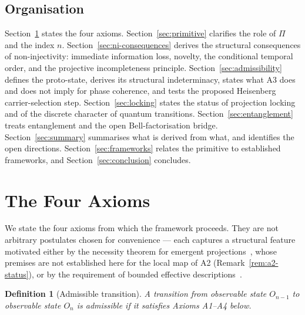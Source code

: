 \documentclass[11pt,a4paper]{article}
\newtheorem{definition}[theorem]{Definition}
\begin{document}
  \subsection*{Organisation}

    Section~\ref{sec:axioms} states the four axioms.
    Section~\ref{sec:primitive} clarifies the role of $\Pi$ and the index $n$.
    Section~\ref{sec:ni-consequences} derives the structural consequences of
    non-injectivity: immediate information loss, novelty, the conditional temporal order, and the
    projective incompleteness principle.
    Section~\ref{sec:admissibility} defines the proto-state, derives its structural indeterminacy, states
    what A3 does and does not imply for phase
    coherence, and tests the proposed Heisenberg carrier-selection step.
    Section~\ref{sec:locking} states the status of projection locking and of the discrete character
    of quantum transitions.
    Section~\ref{sec:entanglement} treats entanglement and the open Bell-factorisation bridge.
    Section~\ref{sec:summary} summarises what is derived from what, and identifies
    the open directions.
    Section~\ref{sec:frameworks} relates the primitive to established frameworks, and
    Section~\ref{sec:conclusion} concludes.

    \clearpage

  \section{The Four Axioms}
  \label{sec:axioms}

  We state the four axioms from which the framework proceeds.
  They are not arbitrary postulates chosen for convenience — each captures
  a structural feature motivated either by the necessity theorem for emergent
  projections~\cite{Beau2026l}, whose premises are not established here for the local map of A2
  (Remark~\ref{rem:a2-status}), or by the requirement of bounded effective descriptions~\cite{Beau2026c}.

  \begin{definition}[Admissible transition]
    \label{def:admissible-transition}
    A transition from observable state $O_{n-1}$ to observable state $O_n$ is
    \emph{admissible} if it satisfies Axioms A1--A4 below.
  \end{definition}
\end{document}
